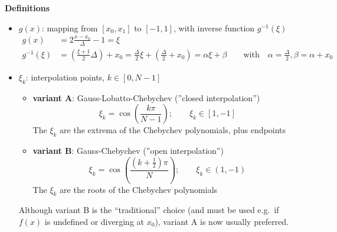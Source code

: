 {\bf Definitions}
\begin{itemize}
  \item $g(x)$: mapping from $[x_0, x_1]$ to $[-1, 1]$,
       with inverse function $g^{-1}(\xi)$
        \begin{align}
          g(x)        & = 2 \frac{x - x_0}{\Delta} - 1 = \xi \\
          g^{-1}(\xi) &= \left( \frac{\xi + 1}{2} \Delta \right) + x_0
                       =  \frac{\Delta}{2} \xi
                          + \left( \frac{\Delta}{2} + x_0\right)
                       = \alpha \xi + \beta
                       \qquad \text{with} \quad
                       \alpha = \frac{\Delta}{2},
                       \beta = \alpha + x_0
        \end{align}
  \item $\xi_k$: interpolation points, $k \in [0,N-1]$
        \begin{itemize}
          \item {\bf variant A}: Gauss-Lobatto-Chebychev
                (''closed interpolation'')
          \begin{equation}
            \xi_k = \cos\left( \frac{k \pi}{N-1}
                        \right); \qquad \xi_k \in [1, -1]
            \label{eq:gauss_lobatto}
          \end{equation}
          The $\xi_k$ are the extrema of the Chebychev polynomials, plus
          endpoints
          \item {\bf variant B}: Gauss-Chebychev (''open interpolation'')
          \begin{equation}
            \xi_k = \cos\left( \frac{\left(k + \frac{1}{2}\right) \pi}{N}
                        \right); \qquad \xi_k \in (1, -1)
            \label{eq:gauss_cheby}
          \end{equation}
          The $\xi_k$ are the roots of the Chebychev polynomials
        \end{itemize}
        Although variant B is the ``traditional'' choice (and must be used e.g.\
        if $f(x)$ is undefined or diverging at $x_0$), variant A is now usually
        preferred.
  \end{itemize}

